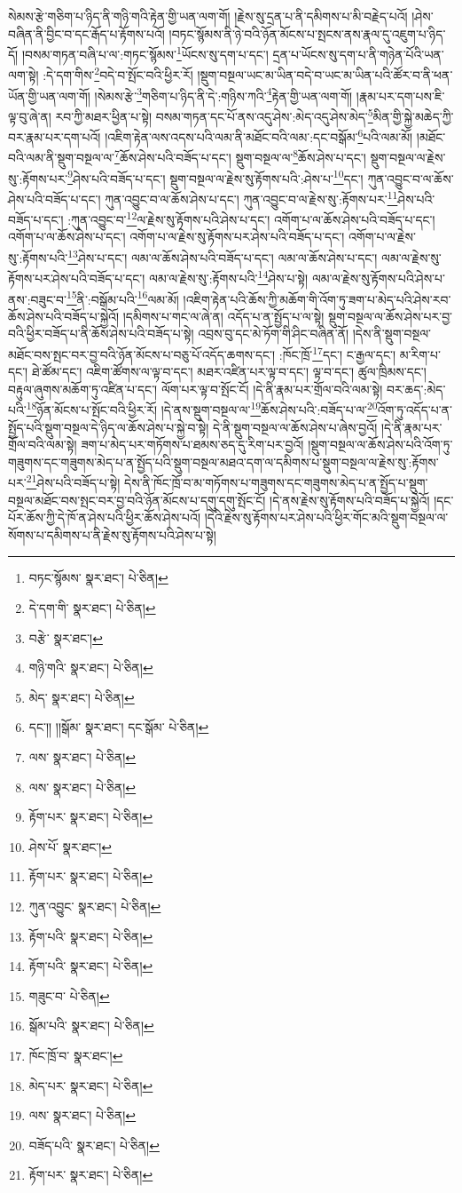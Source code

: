 སེམས་རྩེ་གཅིག་པ་ཉིད་ནི་གཉི་གའི་རྟེན་གྱི་ཡན་ལག་གོ། །རྗེས་སུ་དྲན་པ་ནི་དམིགས་པ་མི་བརྗེད་པའོ། །ཤེས་བཞིན་ནི་བྱིང་བ་དང་རྒོད་པ་རྟོགས་པའོ། །བཏང་སྙོམས་ནི་ཉེ་བའི་ཉོན་མོངས་པ་སྤངས་ནས་རྣལ་དུ་འཇུག་པ་ཉིད་དོ། །བསམ་གཏན་བཞི་པ་ལ་:གཏང་སྙོམས་\footnote{བཏང་སྙོམས་  སྣར་ཐང་།  པེ་ཅིན། }ཡོངས་སུ་དག་པ་དང་། དྲན་པ་ཡོངས་སུ་དག་པ་ནི་གཉེན་པོའི་ཡན་ལག་སྟེ། :དེ་དག་གིས་\footnote{དེ་དག་གི་  སྣར་ཐང་།  པེ་ཅིན། }བདེ་བ་སྤོང་བའི་ཕྱིར་རོ། །སྡུག་བསྔལ་ཡང་མ་ཡིན་བདེ་བ་ཡང་མ་ཡིན་པའི་ཚོར་བ་ནི་ཕན་ཡོན་གྱི་ཡན་ལག་གོ། །སེམས་རྩེ་\footnote{བརྩེ་  སྣར་ཐང་། }གཅིག་པ་ཉིད་ནི་དེ་:གཉིས་ཀའི་\footnote{གཉི་གའི་  སྣར་ཐང་།  པེ་ཅིན། }རྟེན་གྱི་ཡན་ལག་གོ། །རྣམ་པར་དག་པས་ཇི་ལྟ་བུ་ཞེ་ན། རབ་ཀྱི་མཐར་ཕྱིན་པ་སྟེ། བསམ་གཏན་དང་པོ་ནས་འདུ་ཤེས་:མེད་འདུ་ཤེས་མེད་\footnote{མེད་  སྣར་ཐང་།  པེ་ཅིན། }མིན་གྱི་སྐྱེ་མཆེད་ཀྱི་བར་རྣམ་པར་དག་པའོ། །འཇིག་རྟེན་ལས་འདས་པའི་ལམ་ནི་མཐོང་བའི་ལམ་:དང་བསྒོམ་\footnote{དང་།། །།སྒོམ་  སྣར་ཐང་། དང་སྒོམ་  པེ་ཅིན། }པའི་ལམ་མོ། །མཐོང་བའི་ལམ་ནི་སྡུག་བསྔལ་ལ་\footnote{ལས་  སྣར་ཐང་།  པེ་ཅིན། }ཆོས་ཤེས་པའི་བཟོད་པ་དང་། སྡུག་བསྔལ་ལ་\footnote{ལས་  སྣར་ཐང་།  པེ་ཅིན། }ཆོས་ཤེས་པ་དང་། སྡུག་བསྔལ་ལ་རྗེས་སུ་:རྟོགས་པར་\footnote{རྟོག་པར་  སྣར་ཐང་།  པེ་ཅིན། }ཤེས་པའི་བཟོད་པ་དང་། སྡུག་བསྔལ་ལ་རྗེས་སུ་རྟོགས་པའི་:ཤེས་པ་\footnote{ཤེས་པོ་  སྣར་ཐང་། }དང་། ཀུན་འབྱུང་བ་ལ་ཆོས་ཤེས་པའི་བཟོད་པ་དང་། ཀུན་འབྱུང་བ་ལ་ཆོས་ཤེས་པ་དང་། ཀུན་འབྱུང་བ་ལ་རྗེས་སུ་:རྟོགས་པར་\footnote{རྟོག་པར་  སྣར་ཐང་།  པེ་ཅིན། }ཤེས་པའི་བཟོད་པ་དང་། :ཀུན་འབྱུང་བ་\footnote{ཀུན་འབྱུང་  སྣར་ཐང་།  པེ་ཅིན། }ལ་རྗེས་སུ་རྟོགས་པའི་ཤེས་པ་དང་། འགོག་པ་ལ་ཆོས་ཤེས་པའི་བཟོད་པ་དང་། འགོག་པ་ལ་ཆོས་ཤེས་པ་དང་། འགོག་པ་ལ་རྗེས་སུ་རྟོགས་པར་ཤེས་པའི་བཟོད་པ་དང་། འགོག་པ་ལ་རྗེས་སུ་:རྟོགས་པའི་\footnote{རྟོག་པའི་  སྣར་ཐང་།  པེ་ཅིན། }ཤེས་པ་དང་། ལམ་ལ་ཆོས་ཤེས་པའི་བཟོད་པ་དང་། ལམ་ལ་ཆོས་ཤེས་པ་དང་། ལམ་ལ་རྗེས་སུ་རྟོགས་པར་ཤེས་པའི་བཟོད་པ་དང་། ལམ་ལ་རྗེས་སུ་:རྟོགས་པའི་\footnote{རྟོག་པའི་  སྣར་ཐང་།  པེ་ཅིན། }ཤེས་པ་སྟེ། ལམ་ལ་རྗེས་སུ་རྟོགས་པའི་ཤེས་པ་ནས་:བཟུང་བ་\footnote{གཟུང་བ་  པེ་ཅིན། }ནི་:བསྒོམ་པའི་\footnote{སྒོམ་པའི་  སྣར་ཐང་།  པེ་ཅིན། }ལམ་མོ། །འཇིག་རྟེན་པའི་ཆོས་ཀྱི་མཆོག་གི་འོག་ཏུ་ཟག་པ་མེད་པའི་ཤེས་རབ་ཆོས་ཤེས་པའི་བཟོད་པ་སྐྱེའོ། །དམིགས་པ་གང་ལ་ཞེ་ན། འདོད་པ་ན་སྤྱོད་པ་ལ་སྟེ། སྡུག་བསྔལ་ལ་ཆོས་ཤེས་པར་བྱ་བའི་ཕྱིར་བཟོད་པ་ནི་ཆོས་ཤེས་པའི་བཟོད་པ་སྟེ། འབྲས་བུ་དང་མེ་ཏོག་གི་ཤིང་བཞིན་ནོ། །དེས་ནི་སྡུག་བསྔལ་མཐོང་བས་སྤང་བར་བྱ་བའི་ཉོན་མོངས་པ་བཅུ་པོ་འདོད་ཆགས་དང་། :ཁོང་ཁྲོ་\footnote{ཁོང་ཁྲོ་བ་  སྣར་ཐང་། }དང་། ང་རྒྱལ་དང་། མ་རིག་པ་དང་། ཐེ་ཚོམ་དང་། འཇིག་ཚོགས་ལ་ལྟ་བ་དང་། མཐར་འཛིན་པར་ལྟ་བ་དང་། ལྟ་བ་དང་། ཚུལ་ཁྲིམས་དང་། བརྟུལ་ཞུགས་མཆོག་ཏུ་འཛིན་པ་དང་། ལོག་པར་ལྟ་བ་སྤོང་ངོ། །དེ་ནི་རྣམ་པར་གྲོལ་བའི་ལམ་སྟེ། བར་ཆད་:མེད་པའི་\footnote{མེད་པར་  སྣར་ཐང་།  པེ་ཅིན། }ཉོན་མོངས་པ་སྤོང་བའི་ཕྱིར་རོ། །དེ་ནས་སྡུག་བསྔལ་ལ་\footnote{ལས་  སྣར་ཐང་།  པེ་ཅིན། }ཆོས་ཤེས་པའི་:བཟོད་པ་ལ་\footnote{བཟོད་པའི་  སྣར་ཐང་།  པེ་ཅིན། }འོག་ཏུ་འདོད་པ་ན་སྤྱོད་པའི་སྡུག་བསྔལ་དེ་ཉིད་ལ་ཆོས་ཤེས་པ་སྐྱེ་བ་སྟེ། དེ་ནི་སྡུག་བསྔལ་ལ་ཆོས་ཤེས་པ་ཞེས་བྱའོ། །དེ་ནི་རྣམ་པར་གྲོལ་བའི་ལམ་སྟེ། ཟག་པ་མེད་པར་གཏོགས་པ་ཐམས་ཅད་དུ་རིག་པར་བྱའོ། །སྡུག་བསྔལ་ལ་ཆོས་ཤེས་པའི་འོག་ཏུ་གཟུགས་དང་གཟུགས་མེད་པ་ན་སྤྱོད་པའི་སྡུག་བསྔལ་མཐའ་དག་ལ་དམིགས་པ་སྡུག་བསྔལ་ལ་རྗེས་སུ་:རྟོགས་པར་\footnote{རྟོག་པར་  སྣར་ཐང་།  པེ་ཅིན། }ཤེས་པའི་བཟོད་པ་སྟེ། དེས་ནི་ཁོང་ཁྲོ་བ་མ་གཏོགས་པ་གཟུགས་དང་གཟུགས་མེད་པ་ན་སྤྱོད་པ་སྡུག་བསྔལ་མཐོང་བས་སྤང་བར་བྱ་བའི་ཉོན་མོངས་པ་དགུ་དགུ་སྤོང་ངོ། །དེ་ནས་རྗེས་སུ་རྟོགས་པའི་བཟོད་པ་སྐྱེའོ། །དང་པོར་ཆོས་ཀྱི་དེ་ཁོ་ན་ཤེས་པའི་ཕྱིར་ཆོས་ཤེས་པའོ། །དེའི་རྗེས་སུ་རྟོགས་པར་ཤེས་པའི་ཕྱིར་གོང་མའི་སྡུག་བསྔལ་ལ་སོགས་པ་དམིགས་པ་ནི་རྗེས་སུ་རྟོགས་པའི་ཤེས་པ་སྟེ། 